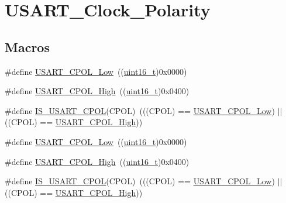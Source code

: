 \hypertarget{group___u_s_a_r_t___clock___polarity}{}\section{U\+S\+A\+R\+T\+\_\+\+Clock\+\_\+\+Polarity}
\label{group___u_s_a_r_t___clock___polarity}
\subsection*{Macros}
\begin{DoxyCompactItemize}
\item 
\#define \hyperlink{group___u_s_a_r_t___clock___polarity_ga194d60b47d8042d39e843c52f3a6aa1a}{U\+S\+A\+R\+T\+\_\+\+C\+P\+O\+L\+\_\+\+Low}~((\hyperlink{_p_e___types_8h_a1f1825b69244eb3ad2c7165ddc99c956}{uint16\+\_\+t})0x0000)
\item 
\#define \hyperlink{group___u_s_a_r_t___clock___polarity_ga4ba6946dd9f0b4fd38115f24798c210f}{U\+S\+A\+R\+T\+\_\+\+C\+P\+O\+L\+\_\+\+High}~((\hyperlink{_p_e___types_8h_a1f1825b69244eb3ad2c7165ddc99c956}{uint16\+\_\+t})0x0400)
\item 
\#define \hyperlink{group___u_s_a_r_t___clock___polarity_ga833e9d2e85ab84658c7a7c18bd0bc8b9}{I\+S\+\_\+\+U\+S\+A\+R\+T\+\_\+\+C\+P\+OL}(C\+P\+OL)~(((C\+P\+OL) == \hyperlink{openmotestm_2library_2inc_2stm32f10x__usart_8h_a194d60b47d8042d39e843c52f3a6aa1a}{U\+S\+A\+R\+T\+\_\+\+C\+P\+O\+L\+\_\+\+Low}) $\vert$$\vert$ ((C\+P\+OL) == \hyperlink{openmotestm_2library_2inc_2stm32f10x__usart_8h_a4ba6946dd9f0b4fd38115f24798c210f}{U\+S\+A\+R\+T\+\_\+\+C\+P\+O\+L\+\_\+\+High}))
\item 
\#define \hyperlink{group___u_s_a_r_t___clock___polarity_ga194d60b47d8042d39e843c52f3a6aa1a}{U\+S\+A\+R\+T\+\_\+\+C\+P\+O\+L\+\_\+\+Low}~((\hyperlink{_p_e___types_8h_a1f1825b69244eb3ad2c7165ddc99c956}{uint16\+\_\+t})0x0000)
\item 
\#define \hyperlink{group___u_s_a_r_t___clock___polarity_ga4ba6946dd9f0b4fd38115f24798c210f}{U\+S\+A\+R\+T\+\_\+\+C\+P\+O\+L\+\_\+\+High}~((\hyperlink{_p_e___types_8h_a1f1825b69244eb3ad2c7165ddc99c956}{uint16\+\_\+t})0x0400)
\item 
\#define \hyperlink{group___u_s_a_r_t___clock___polarity_ga833e9d2e85ab84658c7a7c18bd0bc8b9}{I\+S\+\_\+\+U\+S\+A\+R\+T\+\_\+\+C\+P\+OL}(C\+P\+OL)~(((C\+P\+OL) == \hyperlink{openmotestm_2library_2inc_2stm32f10x__usart_8h_a194d60b47d8042d39e843c52f3a6aa1a}{U\+S\+A\+R\+T\+\_\+\+C\+P\+O\+L\+\_\+\+Low}) $\vert$$\vert$ ((C\+P\+OL) == \hyperlink{openmotestm_2library_2inc_2stm32f10x__usart_8h_a4ba6946dd9f0b4fd38115f24798c210f}{U\+S\+A\+R\+T\+\_\+\+C\+P\+O\+L\+\_\+\+High}))
\end{DoxyCompactItemize}


